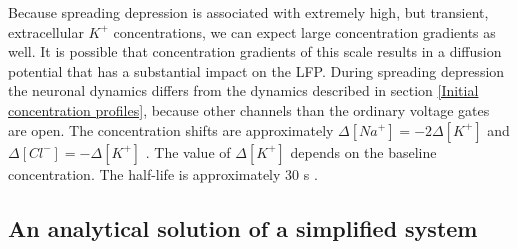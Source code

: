 \documentclass{article}
\begin{document}
Because spreading depression is associated with extremely high, but transient, extracellular $K^+$ concentrations, we can expect large concentration gradients as well. It is possible that concentration gradients of this scale results in a diffusion potential that has a substantial impact on the LFP. During spreading depression the neuronal dynamics differs from the dynamics described in section \ref{Initial concentration profiles}, because other channels than the ordinary voltage gates are open. The concentration shifts are approximately $\Delta [Na^+] = -2\Delta [K^+]$ and $\Delta [Cl^-] = -\Delta[K^+]$ \cite{Herreras1993} \cite{Ataya2015}. The value of $\Delta [K^+]$ depends on the baseline concentration. The half-life is approximately 30 s \cite{Ataya2015}.

\subsection{An analytical solution of a simplified system}
\end{document}
